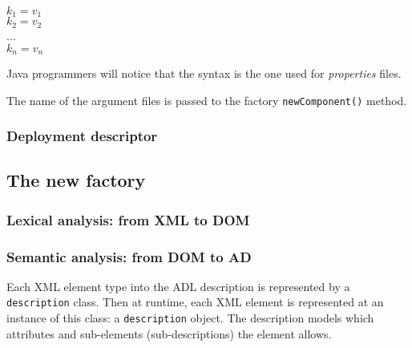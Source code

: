 \documentclass{article}
\newcommand{\code}[1]{\texttt{#1}}
\begin{document}
\begin{center}
$k_1 = v_1$ \\
$k_2 = v_2$ \\
...  \\
$k_n = v_n$
\end{center}

Java programmers will notice that the syntax is the one used for \textit{properties} files.

The name of the argument files is passed to the factory \code{newComponent()} method.
\subsubsection{Deployment descriptor}


\subsection{The new factory}


\subsubsection{Lexical analysis: from XML to DOM}



\subsubsection{Semantic analysis: from DOM to AD}

Each XML element type into the ADL description is represented by a  \code{description} class.
Then at runtime, each XML element is represented at an instance of this class: a  \code{description} object.
The description models which attributes and sub-elements (sub-descriptions) the element allows.
\end{document}
